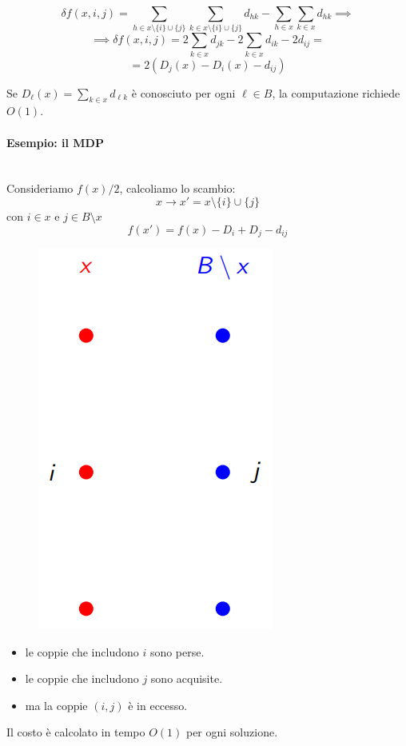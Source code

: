 \documentclass{article}
\begin{document}
$$\delta f(x,i,j)=\sum_{h\in x\setminus\{i\}\cup\{j\}} \sum_{k\in x\setminus\{i\}\cup\{j\}} d_{hk}-\sum_{h\in x}\sum_{k\in x}d_{hk}\implies$$
$$\implies\delta f(x,i,j)=2\sum_{k\in x}d_{jk}-2\sum_{k\in x}d_{ik}-2d_{ij}=$$
$$=2(D_j(x)-D_i(x)-d_{ij})$$

Se $D_\ell (x)=\sum_{k\in x}d_{\ell k}$ è conosciuto per ogni $\ell\in B$, la computazione richiede $O(1)$.

\paragraph{Esempio: il MDP}\mbox{}\\
Consideriamo $f(x)/2$, calcoliamo lo scambio:
$$x\rightarrow x'= x\setminus\{i\}\cup\{j\}$$
con $i\in x$ e $j\in B\setminus x$
$$f(x')=f(x)-D_i+D_j-d_{ij}$$
\begin{figure}[H]
    \centering
    \includegraphics[scale=0.5]{images/lez14_1.png}
\end{figure}
\begin{itemize}
    \item le coppie che includono $i$ sono perse.
    \item le coppie che includono $j$ sono acquisite.
    \item ma la coppie $(i,j)$ è in eccesso.
\end{itemize}
Il costo è calcolato in tempo $O(1)$ per ogni soluzione.
\end{document}
